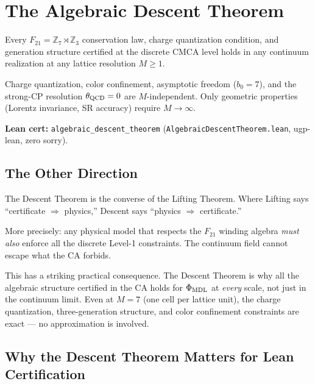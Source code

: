 \documentclass[11pt,a4paper]{article}
\newcommand{\lean}[1]{\texttt{#1}}
\newcommand{\PhiMDL}{\Phi_{\rm MDL}}
\newcommand{\ZS}{\mathbb{Z}_7}
\newcommand{\CatAL}{\textsc{CatAL}}
\begin{document}
\section{The Algebraic Descent Theorem}
\label{sec:descent}

\begin{tcolorbox}[colback=boxblue,colframe=blue!40!black,
  title={Theorem: Algebraic Descent (\CatAL, zero sorry)}]
Every $F_{21} = \ZS\rtimes\mathbb{Z}_3$ conservation law,
charge quantization condition, and generation structure certified at the
discrete CMCA level holds in any continuum realization at any lattice
resolution $M \geq 1$.

Charge quantization, color confinement, asymptotic freedom ($b_0 = 7$),
and the strong-CP resolution $\theta_{\rm QCD} = 0$ are $M$-independent.
Only geometric properties (Lorentz invariance, SR accuracy) require
$M \to \infty$.

\smallskip\noindent
\textbf{Lean cert:}
\lean{algebraic\_descent\_theorem}
(\lean{AlgebraicDescentTheorem.lean}, ugp-lean, zero sorry).
\end{tcolorbox}

\subsection{The Other Direction}

The Descent Theorem is the converse of the Lifting Theorem.
Where Lifting says ``certificate $\Rightarrow$ physics,'' Descent says
``physics $\Rightarrow$ certificate.''

\medskip
More precisely: any physical model that respects the $F_{21}$ winding algebra
\emph{must also} enforce all the discrete Level-1 constraints.
The continuum field cannot escape what the CA forbids.

\medskip
This has a striking practical consequence.
The Descent Theorem is why all the algebraic structure certified in the CA
holds for $\PhiMDL$ at \emph{every} scale, not just in the continuum limit.
Even at $M = 7$ (one cell per lattice unit), the charge quantization,
three-generation structure, and color confinement constraints are exact ---
no approximation is involved.

\subsection{Why the Descent Theorem Matters for Lean Certification}
\end{document}
